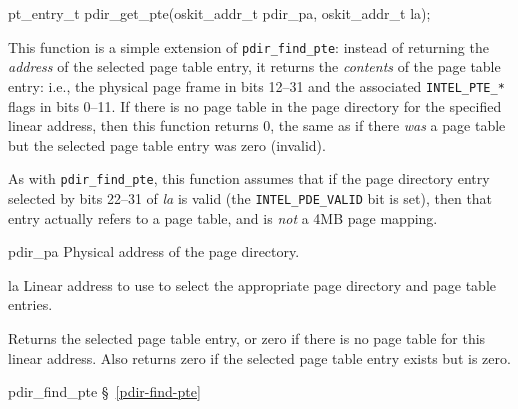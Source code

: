 \label{pdir-get-pte}
\begin{apisyn}

	\funcproto pt_entry_t pdir_get_pte(oskit_addr_t pdir_pa, oskit_addr_t la);
\end{apisyn}
\begin{apidesc}
	This function is a simple extension of {\tt pdir_find_pte}:
	instead of returning the \emph{address} of the selected page table entry,
	it returns the \emph{contents} of the page table entry:
	i.e., the physical page frame in bits 12--31
	and the associated {\tt INTEL_PTE_*} flags in bits 0--11.
	If there is no page table in the page directory
	for the specified linear address,
	then this function returns 0,
	the same as if there \emph{was} a page table
	but the selected page table entry was zero (invalid).

	As with {\tt pdir_find_pte},
	this function assumes that
	if the page directory entry selected by bits 22--31 of \emph{la}
	is valid (the {\tt INTEL_PDE_VALID} bit is set),
	then that entry actually refers to a page table,
	and is \emph{not} a 4MB page mapping.
\end{apidesc}
\begin{apiparm}
	\item[pdir_pa]
		Physical address of the page directory.
	\item[la]
		Linear address to use to select the appropriate
		page directory and page table entries.
\end{apiparm}
\begin{apiret}
	Returns the selected page table entry,
	or zero if there is no page table for this linear address.
	Also returns zero if the selected page table entry exists but is zero.
\end{apiret}
\begin{apidep}
	\item[pdir_find_pte]	\S~\ref{pdir-find-pte}
\end{apidep}

